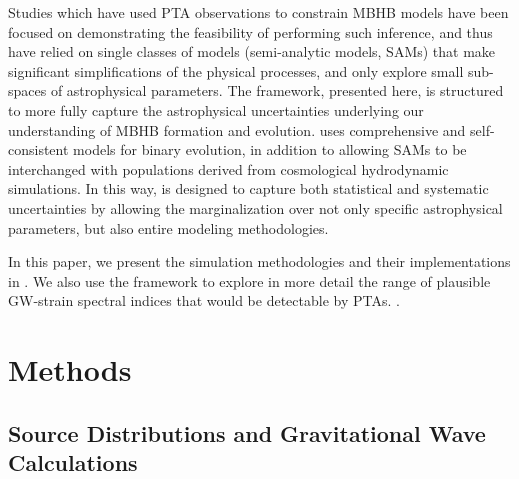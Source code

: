     Studies which have used PTA observations to constrain MBHB models have been focused on demonstrating the feasibility of performing such inference, and thus have relied on single classes of models (semi-analytic models, SAMs) that make significant simplifications of the physical processes, and only explore small sub-spaces of astrophysical parameters.  The \holodeck{} framework, presented here, is structured to more fully capture the astrophysical uncertainties underlying our understanding of MBHB formation and evolution.  \holodeck{} uses comprehensive and self-consistent models for binary evolution, in addition to allowing SAMs to be interchanged with populations derived from cosmological hydrodynamic simulations.  In this way, \holodeck{} is designed to capture both statistical and systematic uncertainties by allowing the marginalization over not only specific astrophysical parameters, but also entire modeling methodologies.

    In this paper, we present the simulation methodologies and their implementations in \holodeck{}.  We also use the framework to explore in more detail the range of plausible GW-strain spectral indices that would be detectable by PTAs. .




\section{Methods}
    \label{sec:meth}

    \subsection{Source Distributions and Gravitational Wave Calculations}

